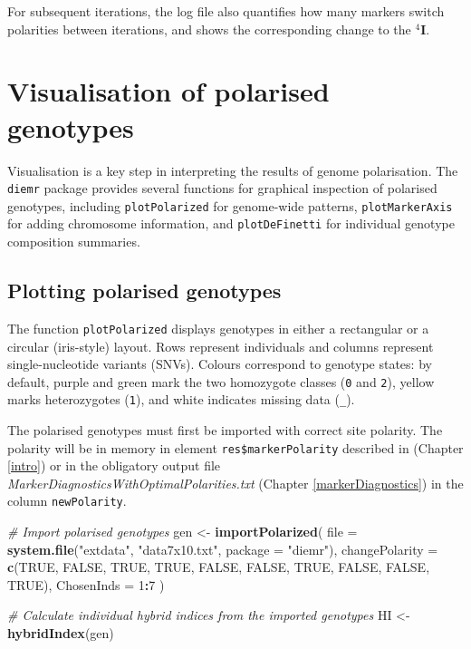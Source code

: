 \documentclass[
]{book}
\newenvironment{Shaded}{\begin{snugshade}}{\end{snugshade}}
\newcommand{\AttributeTok}[1]{\textcolor[rgb]{0.13,0.29,0.53}{#1}}
\newcommand{\CommentTok}[1]{\textcolor[rgb]{0.56,0.35,0.01}{\textit{#1}}}
\newcommand{\ConstantTok}[1]{\textcolor[rgb]{0.56,0.35,0.01}{#1}}
\newcommand{\DecValTok}[1]{\textcolor[rgb]{0.00,0.00,0.81}{#1}}
\newcommand{\FunctionTok}[1]{\textcolor[rgb]{0.13,0.29,0.53}{\textbf{#1}}}
\newcommand{\NormalTok}[1]{#1}
\newcommand{\OtherTok}[1]{\textcolor[rgb]{0.56,0.35,0.01}{#1}}
\newcommand{\SpecialCharTok}[1]{\textcolor[rgb]{0.81,0.36,0.00}{\textbf{#1}}}
\newcommand{\StringTok}[1]{\textcolor[rgb]{0.31,0.60,0.02}{#1}}
\begin{document}
For subsequent iterations, the log file also quantifies how many markers switch polarities between iterations, and shows the corresponding change to the \({}^4\mathbf{I}\).

\chapter{Visualisation of polarised genotypes}\label{visualisation}

Visualisation is a key step in interpreting the results of genome polarisation.
The \texttt{diemr} package provides several functions for graphical inspection of polarised genotypes, including \texttt{plotPolarized} for genome-wide patterns, \texttt{plotMarkerAxis} for adding chromosome information, and \texttt{plotDeFinetti} for individual genotype composition summaries.

\section{Plotting polarised genotypes}\label{plotting-polarised-genotypes}

The function \texttt{plotPolarized} displays genotypes in either a rectangular or a circular (iris-style) layout.
Rows represent individuals and columns represent single-nucleotide variants (SNVs).
Colours correspond to genotype states: by default, purple and green mark the two homozygote classes (\texttt{0} and \texttt{2}), yellow marks heterozygotes (\texttt{1}), and white indicates missing data (\texttt{\_}).

The polarised genotypes must first be imported with correct site polarity. The polarity will be in memory in element \texttt{res\$markerPolarity} described in (Chapter \ref{intro}) or in the obligatory output file \emph{MarkerDiagnosticsWithOptimalPolarities.txt} (Chapter \ref{markerDiagnostics}) in the column \texttt{newPolarity}.

\begin{Shaded}
\begin{Highlighting}[]
\CommentTok{\# Import polarised genotypes}
\NormalTok{gen }\OtherTok{\textless{}{-}} \FunctionTok{importPolarized}\NormalTok{(}
  \AttributeTok{file =} \FunctionTok{system.file}\NormalTok{(}\StringTok{"extdata"}\NormalTok{, }\StringTok{"data7x10.txt"}\NormalTok{, }\AttributeTok{package =} \StringTok{"diemr"}\NormalTok{),}
  \AttributeTok{changePolarity =} \FunctionTok{c}\NormalTok{(}\ConstantTok{TRUE}\NormalTok{, }\ConstantTok{FALSE}\NormalTok{, }\ConstantTok{TRUE}\NormalTok{, }\ConstantTok{TRUE}\NormalTok{, }\ConstantTok{FALSE}\NormalTok{, }\ConstantTok{FALSE}\NormalTok{, }\ConstantTok{TRUE}\NormalTok{, }\ConstantTok{FALSE}\NormalTok{, }\ConstantTok{FALSE}\NormalTok{, }\ConstantTok{TRUE}\NormalTok{),}
  \AttributeTok{ChosenInds =} \DecValTok{1}\SpecialCharTok{:}\DecValTok{7}
\NormalTok{)}

\CommentTok{\# Calculate individual hybrid indices from the imported genotypes }
\NormalTok{HI }\OtherTok{\textless{}{-}} \FunctionTok{hybridIndex}\NormalTok{(gen)}
\end{Highlighting}
\end{Shaded}
\end{document}
